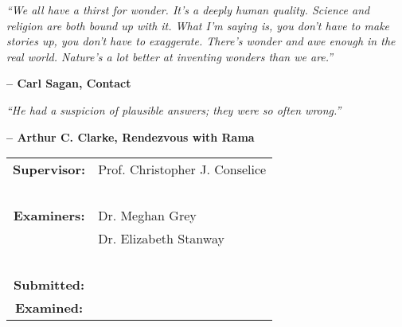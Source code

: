 %
%

\clearpage
\thispagestyle{empty}

\begin{center}


\emph{``We all have a thirst for wonder. It's a deeply human quality. Science and religion are both bound up with it. What I'm saying is, you don't have to make stories up, you don't have to exaggerate. There's wonder and awe enough in the real world. Nature's a lot better at inventing wonders than we are.”}
\begin{flushright}
{\bf -- Carl Sagan, Contact}
\end{flushright}


\emph{``He had a suspicion of plausible answers; they were so often wrong.” }
\begin{flushright}
{\bf --  Arthur C. Clarke, Rendezvous with Rama}
\end{flushright}

\begin{minipage}[c]{8cm}
\begin{tabular}{cl}
{\bf Supervisor:} & Prof. Christopher J. Conselice\\
~ & ~ \\
{\bf Examiners:} & Dr. Meghan Grey\\
~ & Dr. Elizabeth Stanway\\
~ & ~ \\

{\bf Submitted:} & \\

{\bf Examined:} & \\

\end{tabular}
\end{minipage}
\end{center}

\clearpage


